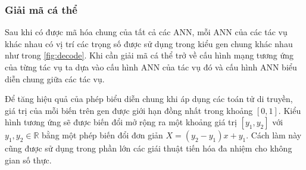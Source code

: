 \subsubsection{Giải mã cá thể}
Sau khi có được mã hóa chung của tất cả các ANN, mỗi ANN của các tác vụ khác nhau có vị trí các trọng số được sử dụng trong kiểu gen chung khác nhau như trong \ref{fig:decode}. Khi cần giải mã cá thể trở về cấu hình mạng tương ứng của từng tác vụ ta dựa vào cấu hình ANN của tác vụ đó và cấu hình ANN biểu diễn chung giữa các tác vụ.

Để tăng hiệu quả của phép biểu diễn chung khi áp dụng các toán tử di truyền, giá trị của mỗi biến trên gen được giới hạn đồng nhất trong khoảng $[0,1]$. Kiểu hình tương ứng sẽ được biến đổi mở rộng ra một khoảng giá trị $[y_1, y_2]$ với $y_1, y_2 \in \mathbb{R}$ bằng một phép biến đổi đơn giản $X = (y_2-y_1) x + y_1$. Cách làm này cũng được sử dụng trong phần lớn các giái thuật tiến hóa đa nhiệm cho không gian số thực.



    
 

